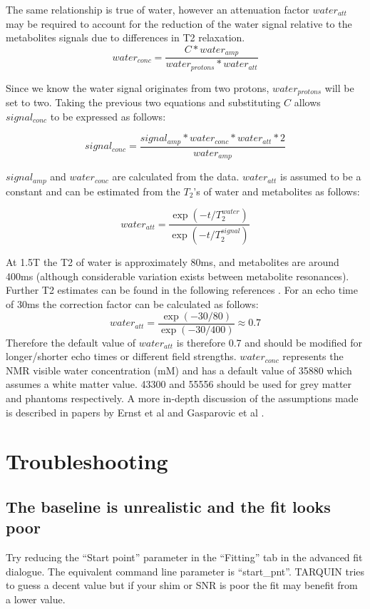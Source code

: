 \documentclass[a4paper,12pt]{article}
\begin{document}
The same relationship is true of water, however an attenuation factor $water_{att}$ may be required to account for the reduction of the water signal relative to the metabolites signals due to differences in T2 relaxation.
\begin{equation}
water_{conc} = \frac{C * water_{amp}}{water_{protons} * water_{att}}
\end{equation}

Since we know the water signal originates from two protons, $water_{protons}$ will be set to two.  Taking the previous two equations and substituting $C$ allows $signal_{conc}$ to be expressed as follows:

\begin{equation}
signal_{conc} = \frac{signal_{amp} * water_{conc} * water_{att} * 2}{water_{amp}}
\end{equation}

$signal_{amp}$ and $water_{conc}$ are calculated from the data. $water_{att}$ is assumed to be a constant and can be estimated from the $T_2$'s of water and metabolites as follows:

\begin{equation}
water_{att} = \frac{\exp(-t/T_2^{water})}{\exp(-t/T_2^{signal})}
\end{equation}

At 1.5T the T2 of water is approximately 80ms, and metabolites are around 400ms (although considerable variation exists between metabolite resonances). Further T2 estimates can be found in the following references \cite{metab_t2_3t,water_relaxation}. For an echo time of 30ms the correction factor can be calculated as follows:
\begin{equation}
water_{att} = \frac{\exp(-30/80)}{\exp(-30/400)} \approx 0.7
\end{equation}
Therefore the default value of $water_{att}$ is therefore 0.7 and should be modified for longer/shorter echo times or different field strengths. $water_{conc}$ represents the NMR visible water concentration (mM) and has a default value of 35880 which assumes a white matter value. 43300 and 55556 should be used for grey matter and phantoms respectively. A more in-depth discussion of the assumptions made is described in papers by Ernst et al \cite{water_ref} and Gasparovic et al \cite{csi_water_ref}.


\section{Troubleshooting}
\subsection{The baseline is unrealistic and the fit looks poor}
Try reducing the ``Start point'' parameter in the ``Fitting'' tab in the advanced fit dialogue.  The equivalent command line parameter is ``start\_pnt''. TARQUIN tries to guess a decent value but if your shim or SNR is poor the fit may benefit from a lower value.
\end{document}
